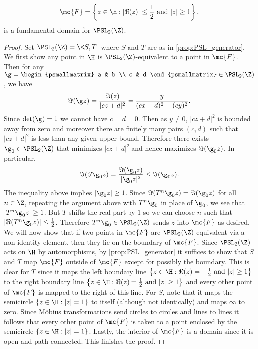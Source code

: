       \begin{proposition}\label{prop:fundamental_domain_modular_group}
        \[
          \mc{F} = \left\{z \in \H:\text{$|\Re(z)| \le \frac{1}{2}$ and $|z| \ge 1$}\right\},
        \]
        is a fundamental domain for $\PSL_{2}(\Z)$.
      \end{proposition}
      \begin{proof}
        Set $\PSL_{2}(\Z) = \<S,T\>$ where $S$ and $T$ are as in \cref{prop:PSL_generator}. We first show any point in $\H$ is $\PSL_{2}(\Z)$-equivalent to a point in $\mc{F}$. Then for any $\g = \begin{psmallmatrix} a & b \\ c & d \end{psmallmatrix} \in \PSL_{2}(\Z)$, we have
        \[
          \Im(\g z) = \frac{\Im(z)}{|cz+d|^{2}} = \frac{y}{(cx+d)^{2}+(cy)^{2}}.
        \]
        Since $\det(\g) = 1$ we cannot have $c = d = 0$. Then as $y \neq 0$, $|cz+d|^{2}$ is bounded away from zero and moreover there are finitely many pairs $(c,d)$ such that $|cz+d|^{2}$ is less than any given upper bound. Therefore there exists $\g_{0} \in \PSL_{2}(\Z)$ that minimizes $|cz+d|^{2}$ and hence maximizes $\Im(\g_{0}z)$. In particular,
        \[
          \Im(S\g_{0}z) = \frac{\Im(\g_{0}z)}{|\g_{0}z|^{2}} \le \Im(\g_{0}z).
        \]
        The inequality above implies $|\g_{0}z| \ge 1$. Since $\Im(T^{n}\g_{0}z) = \Im(\g_{0}z)$ for all $n \in \Z$, repeating the argument above with $T^{n}\g_{0}$ in place of $\g_{0}$, we see that $|T^{n}\g_{0}z| \ge 1$. But $T$ shifts the real part by $1$ so we can choose $n$ such that $|\Re(T^{n}\g_{0}z)| \le \frac{1}{2}$. Therefore $T^{n}\g_{0} \in \PSL_{2}(\Z)$ sends $z$ into $\mc{F}$ as desired. We will now show that if two points in $\mc{F}$ are $\PSL_{2}(\Z)$-equivalent via a non-identity element, then they lie on the boundary of $\mc{F}$. Since $\PSL_{2}(\Z)$ acts on $\H$ by automorphisms, by \cref{prop:PSL_generator} it suffices to show that $S$ and $T$ map $\mc{F}$ outside of $\mc{F}$ except for possibly the boundary. This is clear for $T$ since it maps the left boundary line $\left\{z \in \H:\text{$\Re(z) = -\frac{1}{2}$ and $|z| \ge 1$}\right\}$ to the right boundary line $\left\{z \in \H:\text{$\Re(z) = \frac{1}{2}$ and $|z| \ge 1$}\right\}$ and every other point of $\mc{F}$ is mapped to the right of this line. For $S$, note that it maps the semicircle $\{z \in \H:|z| = 1\}$ to itself (although not identically) and maps $\infty$ to zero. Since M\"obius transformations send circles to circles and lines to lines it follows that every other point of $\mc{F}$ is taken to a point enclosed by the semicircle $\{z \in \H:|z| = 1\}$. Lastly, the interior of $\mc{F}$ is a domain since it is open and path-connected. This finishes the proof.
      \end{proof}

